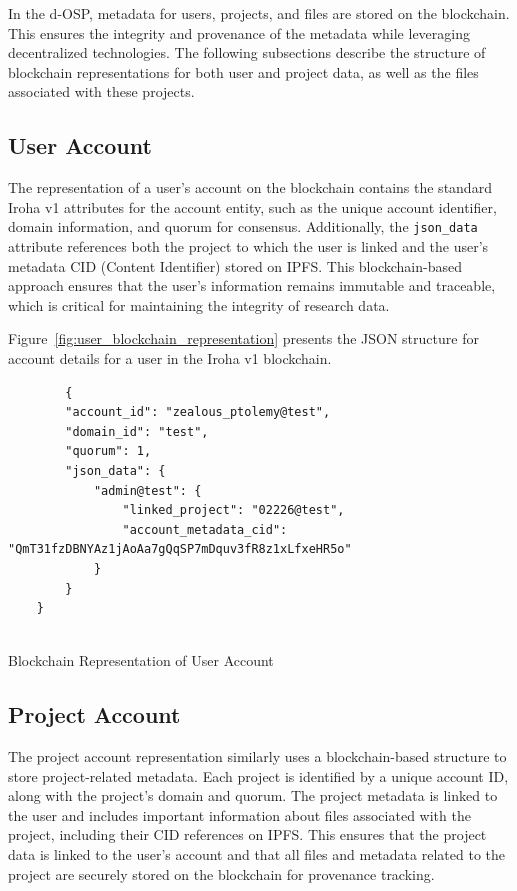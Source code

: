 \documentclass[final]{rc-book-2.14}
\begin{document}
In the d-OSP, metadata for users, projects, and files are stored on the blockchain. This ensures the integrity and provenance of the metadata while leveraging decentralized technologies. The following subsections describe the structure of blockchain representations for both user and project data, as well as the files associated with these projects.

\subsection{User Account}

The representation of a user's account on the blockchain contains the standard Iroha v1 attributes for the account entity, such as the unique account identifier, domain information, and quorum for consensus. Additionally, the \texttt{json\_data} attribute references both the project to which the user is linked and the user's metadata CID (Content Identifier) stored on IPFS. This blockchain-based approach ensures that the user’s information remains immutable and traceable, which is critical for maintaining the integrity of research data.

Figure~\ref{fig:user_blockchain_representation} presents the JSON structure for account details for a user in the Iroha v1 blockchain.


\begin{listing}
\begin{verbatim}
        {
        "account_id": "zealous_ptolemy@test",
        "domain_id": "test",
        "quorum": 1,
        "json_data": {
            "admin@test": {
                "linked_project": "02226@test",
                "account_metadata_cid": "QmT31fzDBNYAz1jAoAa7gQqSP7mDquv3fR8z1xLfxeHR5o"
            }
        }
    }
  
\end{verbatim}
\caption{Blockchain Representation of User Account}
\label{fig:user_blockchain_representation}
\end{listing}



\subsection{Project Account}

The project account representation similarly uses a blockchain-based structure to store project-related metadata. Each project is identified by a unique account ID, along with the project’s domain and quorum. The project metadata is linked to the user and includes important information about files associated with the project, including their CID references on IPFS. This ensures that the project data is linked to the user’s account and that all files and metadata related to the project are securely stored on the blockchain for provenance tracking.
\end{document}
